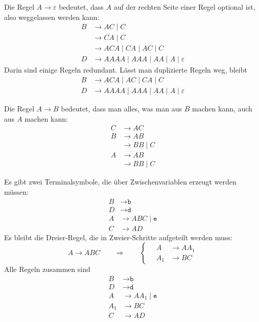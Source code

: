 \begin{loesung}
\begin{teilaufgaben}
\item
Die Regel $A\to\varepsilon$ bedeutet, dass $A$ auf der rechten Seite
einer Regel optional ist, also weggelassen werden kann:
\begin{align*}
B&\to AC \mid C     \\
 &\to CA \mid C     \\
 &\to ACA \mid CA \mid AC \mid C    \\
D&\to AAAA \mid AAA \mid AA \mid A \mid \varepsilon
\end{align*}
Darin sind einige Regeln redundant. 
Lässt man duplizierte Regeln weg, bleibt
\begin{align*}
B&\to ACA \mid AC \mid CA \mid C \\
D&\to AAAA \mid AAA \mid AA \mid A \mid \varepsilon
\end{align*}
\item
Die Regel $A\to B$ bedeutet, dass man alles, was man aus $B$ machen kann,
auch aus $A$ machen kann:
\begin{align*}
C &\to AC     \\
B &\to AB     \\
  &\to BB \mid C  \\
A &\to AB     \\
  &\to BB \mid C 
\end{align*}
\item
Es gibt zwei Terminalsymbole, die über Zwischenvariablen erzeugt
werden müssen:
\begin{align*}
B & \to \texttt{b} \\
D & \to \texttt{d} \\
A&\to ABC \mid \texttt{e} \\
C&\to AD
\end{align*}
Es bleibt die Dreier-Regel, die in Zweier-Schritte aufgeteilt werden
muss:
\[
A\to ABC
\qquad\Rightarrow\qquad
\left\{\quad
\begin{aligned}
A&\to AA_1 \\
A_1&\to BC
\end{aligned}
\right.
\]
Alle Regeln zusammen sind
\begin{align*}
B & \to \texttt{b} \\
D & \to \texttt{d} \\
A&\to AA_1 \mid \texttt{e} \\
A_1&\to BC \\
C&\to AD
\end{align*}
\end{teilaufgaben}
\end{loesung}
